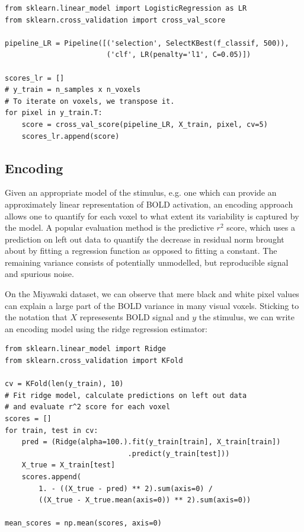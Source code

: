 \documentclass{frontiersSCNS} %
\begin{document}
\begin{lstlisting}
from sklearn.linear_model import LogisticRegression as LR
from sklearn.cross_validation import cross_val_score

pipeline_LR = Pipeline([('selection', SelectKBest(f_classif, 500)),
                        ('clf', LR(penalty='l1', C=0.05)])

scores_lr = []
# y_train = n_samples x n_voxels
# To iterate on voxels, we transpose it.
for pixel in y_train.T:
    score = cross_val_score(pipeline_LR, X_train, pixel, cv=5)
    scores_lr.append(score)
\end{lstlisting}




\subsection{Encoding}
Given an appropriate model of the stimulus, e.g. one which can provide an
approximately linear representation of BOLD activation, an encoding approach
allows one to quantify for each voxel to what extent its variability is captured
by the model. A popular evaluation method is the predictive \(r^2\) score, which
uses a prediction on left out data to quantify the decrease in residual norm 
brought about by fitting a regression function as opposed to fitting a constant. 
The remaining variance consists of potentially unmodelled, but reproducible signal
and spurious noise.

On the Miyawaki dataset, we can observe that mere black and white pixel values
can explain a large part of the BOLD variance in many visual voxels. Sticking
to the notation that \(X\) represesents BOLD signal and \(y\) the stimulus, we
can write an encoding model using the ridge regression estimator:

\begin{lstlisting}
from sklearn.linear_model import Ridge
from sklearn.cross_validation import KFold

cv = KFold(len(y_train), 10)
# Fit ridge model, calculate predictions on left out data
# and evaluate r^2 score for each voxel
scores = []
for train, test in cv:
    pred = (Ridge(alpha=100.).fit(y_train[train], X_train[train])
                             .predict(y_train[test]))
    X_true = X_train[test]
    scores.append(
        1. - ((X_true - pred) ** 2).sum(axis=0) /
        ((X_true - X_true.mean(axis=0)) ** 2).sum(axis=0))

mean_scores = np.mean(scores, axis=0)
\end{lstlisting}
\end{document}
